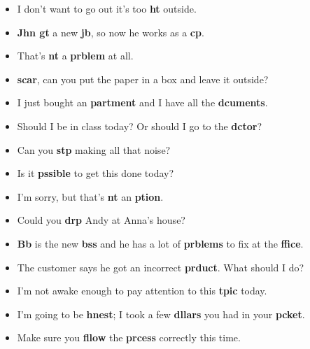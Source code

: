   
  \begin{itemize}
    \item I don't want to go out it's too \textbf{ht} outside.
    \item \textbf{Jhn gt} a new \textbf{jb}, so now he works as a \textbf{cp}.
    \item That's \textbf{nt} a \textbf{prblem} at all.
    \item \textbf{scar}, can you put the paper in a box and leave it outside?
    \item I just bought an \textbf{partment} and I have all the \textbf{dcuments}.
    \item Should I be in class today? Or should I go to the \textbf{dctor}?
    \item Can you \textbf{stp} making all that noise?
    \item Is it \textbf{pssible} to get this done today?
    \item I'm sorry, but that's \textbf{nt} an \textbf{ption}.
    \item Could you \textbf{drp} Andy at Anna's house?
    \item \textbf{Bb} is the new \textbf{bss} and he has a lot of \textbf{prblems} to fix at the \textbf{ffice}.
    \item The customer says he got an incorrect \textbf{prduct}. What should I do?
    \item I'm not awake enough to pay attention to this \textbf{tpic} today.
    \item I'm going to be \textbf{hnest}; I took a few \textbf{dllars} you had in your \textbf{pcket}.
    \item Make sure you \textbf{fllow} the \textbf{prcess} correctly this time.
  \end{itemize}

  \newpage